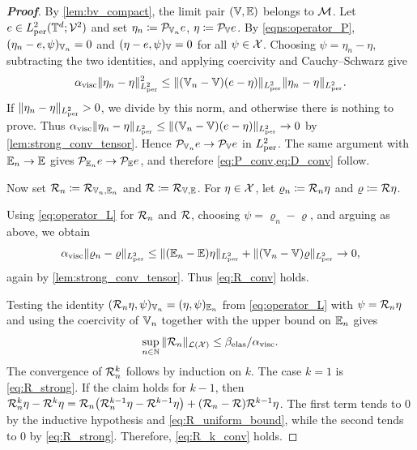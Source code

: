 \begin{proof}[\bf Proof]
{By \cref{lem:bv_compact}, the limit pair $(\mathbb{V},\mathbb{E})$ belongs to ${\mathcal{M}}$. Let $e\in L^2_{\rm per}(\mathbb{T}^d;{\mathcal{V}}^2)$ and set $\eta_n\coloneqq{\mathcal{P}}_{\mathbb{V}_n}e$, $\eta\coloneqq{\mathcal{P}}_{\mathbb{V}}e$. By \cref{eqns:operator_P}, $(\eta_n-e,\psi)_{\mathbb{V}_n}=0$ and $(\eta-e,\psi)_{\mathbb{V}}=0$ for all $\psi\in{\mathcal{X}}$. Choosing $\psi=\eta_n-\eta$, subtracting the two identities, and applying coercivity and Cauchy--Schwarz give
\begin{equation*}
    \alpha_{\rm visc}\|\eta_n-\eta\|_{L^2_{\rm per}}^2
\le \|(\mathbb{V}_n-\mathbb{V})(e-\eta)\|_{L^2_{\rm per}}\|\eta_n-\eta\|_{L^2_{\rm per}}.
\end{equation*}
If $\|\eta_n-\eta\|_{L^2_{\rm per}}>0$, we divide by this norm, and otherwise there is nothing to prove. Thus $\alpha_{\rm visc}\|\eta_n-\eta\|_{L^2_{\rm per}}
\le \|(\mathbb{V}_n-\mathbb{V})(e-\eta)\|_{L^2_{\rm per}}\to 0$ by \cref{lem:strong_conv_tensor}. Hence ${\mathcal{P}}_{\mathbb{V}_n}e\to{\mathcal{P}}_{\mathbb{V}}e$ in $L^2_{\rm per}$. The same argument with $\mathbb{E}_n\to\mathbb{E}$ gives ${\mathcal{P}}_{\mathbb{E}_n}e\to{\mathcal{P}}_{\mathbb{E}}e$, and therefore \cref{eq:P_conv,eq:D_conv} follow.}

Now set ${\mathcal{R}}_n\coloneqq{\mathcal{R}}_{\mathbb{V}_n,\mathbb{E}_n}$ and ${\mathcal{R}}\coloneqq{\mathcal{R}}_{\mathbb{V},\mathbb{E}}$. For $\eta\in{\mathcal{X}}$, let $\varrho_n\coloneqq{\mathcal{R}}_n\eta$ and $\varrho\coloneqq{\mathcal{R}}\eta$. {Using \cref{eq:operator_L} for ${\mathcal{R}}_n$ and ${\mathcal{R}}$, choosing $\psi=\varrho_n-\varrho$, and arguing as above, we obtain
\begin{equation}\label{eq:R_strong}
\alpha_{\rm visc}\|\varrho_n-\varrho\|_{L^2_{\rm per}}
\le \|(\mathbb{E}_n-\mathbb{E})\eta\|_{L^2_{\rm per}}+\|(\mathbb{V}_n-\mathbb{V})\varrho\|_{L^2_{\rm per}}\to 0,
\end{equation}
again by \cref{lem:strong_conv_tensor}. Thus \cref{eq:R_conv} holds.

Testing the identity $({\mathcal{R}}_n\eta,\psi)_{\mathbb{V}_n}=(\eta,\psi)_{\mathbb{E}_n}$ from \cref{eq:operator_L} with $\psi={\mathcal{R}}_n\eta$ and using the coercivity of $\mathbb{V}_n$ together with the upper bound on $\mathbb{E}_n$ gives
\begin{equation}\label{eq:R_uniform_bound}
\sup_{n\in\mathbb{N}}\|{\mathcal{R}}_n\|_{{\mathcal{L}}({\mathcal{X}})} \le \beta_{\rm elas}/\alpha_{\rm visc}.
\end{equation}
The convergence of ${\mathcal{R}}_n^k$ follows by induction on $k$. The case $k=1$ is \cref{eq:R_strong}. If the claim holds for $k-1$, then ${\mathcal{R}}_n^k\eta-{\mathcal{R}}^k\eta={\mathcal{R}}_n\bigl({\mathcal{R}}_n^{k-1}\eta-{\mathcal{R}}^{k-1}\eta\bigr)+({\mathcal{R}}_n-{\mathcal{R}}){\mathcal{R}}^{k-1}\eta$. The first term tends to $0$ by the inductive hypothesis and \cref{eq:R_uniform_bound}, while the second tends to $0$ by \cref{eq:R_strong}. Therefore, \cref{eq:R_k_conv} holds.}
\end{proof}


